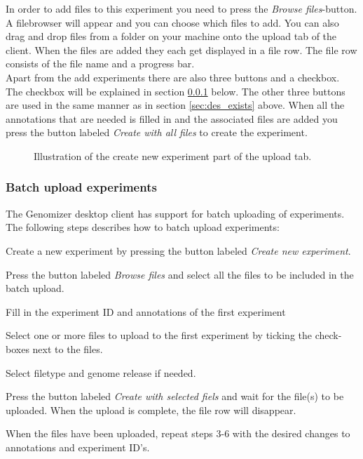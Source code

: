 In order to add files to this experiment you need to press the \textit{Browse files}-button. A filebrowser will appear and you can choose which files to add. You can also drag and drop files from a folder on your machine onto the upload tab of the client. When the files are added they each get displayed in a file row. The file row consists of the file name and a progress bar. \\

Apart from the add experiments there are also three buttons and a checkbox. The checkbox will be explained in section \ref{sec:des_batch} below. The other three buttons are used in the same manner as in section \ref{sec:des_exists} above. When all the annotations that are needed is filled in and the associated files are added you press the button labeled \textit{Create with all files} to create the experiment.

\begin{figure}[h]
	\caption{Illustration of the create new experiment part of the upload tab.}
	\label{fig:des_upload-new}
\end{figure}
\subsubsection{Batch upload experiments}
\label{sec:des_batch}
The Genomizer desktop client has support for batch uploading of experiments. The following steps describes how to batch upload experiments:
	\item Create a new experiment by pressing the button labeled \textit{Create new experiment}.
	\item Press the button labeled \textit{Browse files} and select all the files to be included in the batch upload.
	\item Fill in the experiment ID and annotations of the first experiment
	\item Select one or more files to upload to the first experiment by ticking the check-boxes next to the files.
	\item Select filetype and genome release if needed.
	\item Press the button labeled \textit{Create with selected fiels} and wait for the file(s) to be uploaded. When the upload is complete, the file row will disappear.
	\item When the files have been uploaded, repeat steps 3-6 with the desired changes to annotations and experiment ID's.
	
